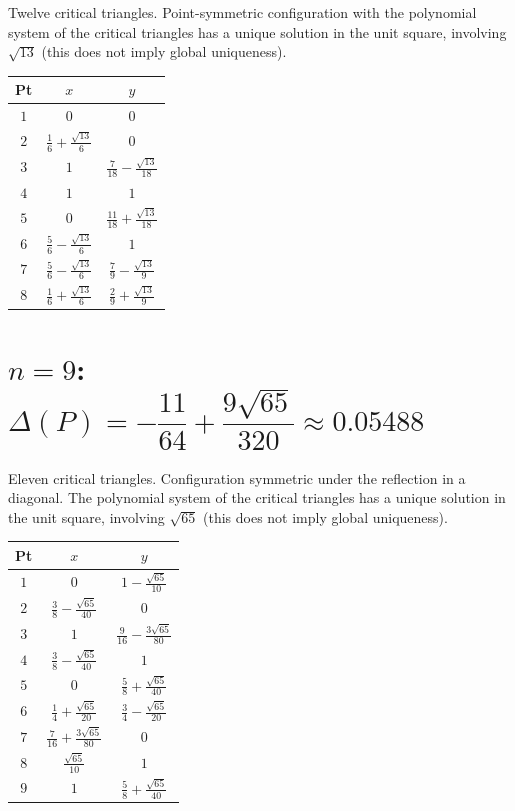 \documentclass[11pt]{article}
\begin{document}
Twelve critical triangles. Point-symmetric configuration with
the polynomial system of the critical triangles has a unique solution in the unit square, involving $\sqrt{13}$ (this does not imply global uniqueness).

\begin{center}
\begin{tabular}{c c c}
\toprule
Pt & $x$ & $y$ \\
\midrule
$1$ & $0$ & $0$ \\[4pt]
$2$ & $\frac{1}{6}+\frac{\sqrt{13}}{6}$ & $0$ \\[4pt]
$3$ & $1$ & $\frac{7}{18}-\frac{\sqrt{13}}{18}$ \\[4pt]
$4$ & $1$ & $1$ \\[4pt]
$5$ & $0$ & $\frac{11}{18}+\frac{\sqrt{13}}{18}$ \\[4pt]
$6$ & $\frac{5}{6}-\frac{\sqrt{13}}{6}$ & $1$ \\[4pt]
$7$ & $\frac{5}{6}-\frac{\sqrt{13}}{6}$ & $\frac{7}{9}-\frac{\sqrt{13}}{9}$ \\[4pt]
$8$ & $\frac{1}{6}+\frac{\sqrt{13}}{6}$ & $\frac{2}{9}+\frac{\sqrt{13}}{9}$ \\
\bottomrule
\end{tabular}
\end{center}

\section*{$n = 9$: \quad $\Delta(P) = -\dfrac{11}{64}+\dfrac{9\sqrt{65}}{320} \approx 0.05488$}

Eleven critical triangles. Configuration symmetric under the reflection
in a diagonal. The polynomial system of the critical triangles has a unique solution in the unit square, involving $\sqrt{65}$ (this does not imply global uniqueness).

\begin{center}
\begin{tabular}{c c c}
\toprule
Pt & $x$ & $y$ \\
\midrule
$1$ & $0$ & $1-\frac{\sqrt{65}}{10}$ \\[4pt]
$2$ & $\frac{3}{8}-\frac{\sqrt{65}}{40}$ & $0$ \\[4pt]
$3$ & $1$ & $\frac{9}{16}-\frac{3\sqrt{65}}{80}$ \\[4pt]
$4$ & $\frac{3}{8}-\frac{\sqrt{65}}{40}$ & $1$ \\[4pt]
$5$ & $0$ & $\frac{5}{8}+\frac{\sqrt{65}}{40}$ \\[4pt]
$6$ & $\frac{1}{4}+\frac{\sqrt{65}}{20}$ & $\frac{3}{4}-\frac{\sqrt{65}}{20}$ \\[4pt]
$7$ & $\frac{7}{16}+\frac{3\sqrt{65}}{80}$ & $0$ \\[4pt]
$8$ & $\frac{\sqrt{65}}{10}$ & $1$ \\[4pt]
$9$ & $1$ & $\frac{5}{8}+\frac{\sqrt{65}}{40}$ \\
\bottomrule
\end{tabular}
\end{center}
\end{document}
